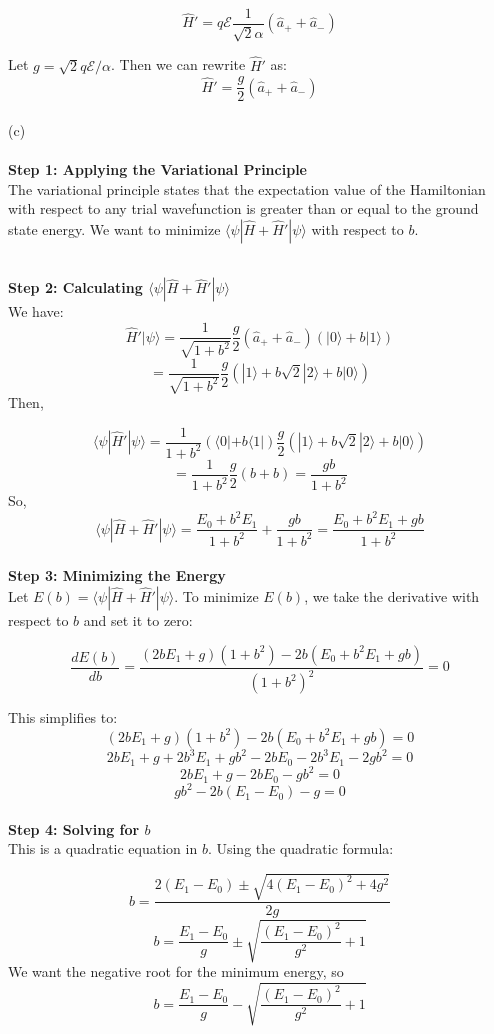 \documentclass{article}
\begin{document}
\[
\hat{H}' = q \mathcal{E} \frac{1}{\sqrt{2} \alpha} (\hat{a}_+ + \hat{a}_-)
\]

Let \(g = \sqrt{2}q\mathcal{E}/\alpha\). Then we can rewrite \(\hat{H}'\) as:
\[
\hat{H}' = \frac{g}{2}(\hat{a}_+ + \hat{a}_-)
\]
\noindent \\
\noindent (c) \\

\noindent \\
\textbf{Step 1: Applying the Variational Principle} \\
The variational principle states that the expectation value of the Hamiltonian with respect to any trial wavefunction is greater than or equal to the ground state energy. We want to minimize \(\langle\psi|\hat{H} + \hat{H}'|\psi\rangle\) with respect to \(b\).

\noindent \\
\textbf{Step 2: Calculating \(\langle\psi|\hat{H} + \hat{H}'|\psi\rangle\)} \\
We have:
\[
\hat{H}'|\psi\rangle = \frac{1}{\sqrt{1+b^2}}\frac{g}{2}(\hat{a}_+ + \hat{a}_-)(|0\rangle + b|1\rangle)
\]
\[
= \frac{1}{\sqrt{1+b^2}}\frac{g}{2}(|1\rangle + b\sqrt{2}|2\rangle + b|0\rangle)
\]
Then,

\[
\langle\psi|\hat{H}'|\psi\rangle = \frac{1}{1+b^2}(\langle 0| + b\langle 1|)\frac{g}{2}(|1\rangle + b\sqrt{2}|2\rangle + b|0\rangle)
\]
\[
= \frac{1}{1+b^2}\frac{g}{2}(b + b) = \frac{gb}{1+b^2}
\]
So,
\[
\langle\psi|\hat{H} + \hat{H}'|\psi\rangle = \frac{E_0 + b^2 E_1}{1+b^2} + \frac{gb}{1+b^2} = \frac{E_0 + b^2 E_1 + gb}{1+b^2}
\]
\noindent \\
\textbf{Step 3: Minimizing the Energy} \\
Let \(E(b) = \langle\psi|\hat{H} + \hat{H}'|\psi\rangle\). To minimize \(E(b)\), we take the derivative with respect to \(b\) and set it to zero:

\[
\frac{dE(b)}{db} = \frac{(2bE_1 + g)(1+b^2) - 2b(E_0 + b^2 E_1 + gb)}{(1+b^2)^2} = 0
\]

This simplifies to:
\[
(2bE_1 + g)(1+b^2) - 2b(E_0 + b^2 E_1 + gb) = 0
\]
\[
2bE_1 + g + 2b^3 E_1 + gb^2 - 2bE_0 - 2b^3 E_1 - 2gb^2 = 0
\]
\[
2bE_1 + g - 2bE_0 - gb^2 = 0
\]
\[
gb^2 - 2b(E_1 - E_0) - g = 0
\]
\noindent \\
\textbf{Step 4: Solving for \(b\)} \\
This is a quadratic equation in \(b\). Using the quadratic formula:

\[
b = \frac{2(E_1 - E_0) \pm \sqrt{4(E_1 - E_0)^2 + 4g^2}}{2g}
\]
\[
b = \frac{E_1 - E_0}{g} \pm \sqrt{\frac{(E_1 - E_0)^2}{g^2} + 1}
\]
We want the negative root for the minimum energy, so
\[
b = \frac{E_1 - E_0}{g} - \sqrt{\frac{(E_1 - E_0)^2}{g^2} + 1}
\]
\end{document}
